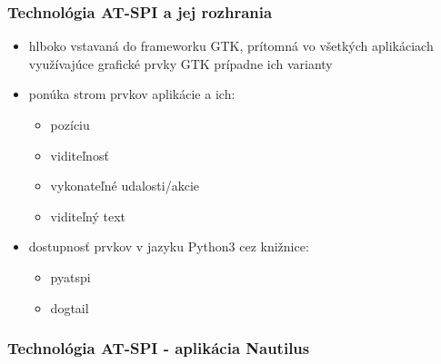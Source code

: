 \documentclass[10pt,xcolor=pdflatex,hyperref={unicode}]{beamer}
\begin{document}
\begin{frame}\frametitle{Technológia AT-SPI a jej rozhrania}
    \begin{itemize}
        \item hlboko vstavaná do frameworku GTK, prítomná vo všetkých aplikáciach využívajúce grafické prvky GTK prípadne ich varianty
        \item ponúka strom prvkov aplikácie a ich:
        \begin{itemize}
            \item pozíciu
            \item viditeľnosť
            \item vykonateľné udalosti/akcie
            \item viditeľný text
        \end{itemize}
        \item dostupnosť prvkov v jazyku Python3 cez knižnice:
        \begin{itemize}
            \item pyatspi
            \item dogtail
        \end{itemize}
    \end{itemize}
\end{frame}

\begin{frame}\frametitle{Technológia AT-SPI - aplikácia Nautilus}
    \begin{figure}[h]
        \label{sniff}
    \end{figure}
\end{frame}
\end{document}
